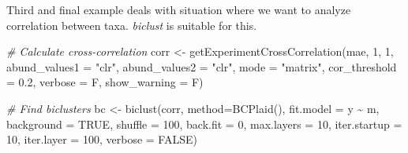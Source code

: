 \documentclass[
]{book}
\newenvironment{Shaded}{\begin{snugshade}}{\end{snugshade}}
\newcommand{\AttributeTok}[1]{\textcolor[rgb]{0.77,0.63,0.00}{#1}}
\newcommand{\CommentTok}[1]{\textcolor[rgb]{0.56,0.35,0.01}{\textit{#1}}}
\newcommand{\ConstantTok}[1]{\textcolor[rgb]{0.00,0.00,0.00}{#1}}
\newcommand{\DecValTok}[1]{\textcolor[rgb]{0.00,0.00,0.81}{#1}}
\newcommand{\FloatTok}[1]{\textcolor[rgb]{0.00,0.00,0.81}{#1}}
\newcommand{\FunctionTok}[1]{\textcolor[rgb]{0.00,0.00,0.00}{#1}}
\newcommand{\NormalTok}[1]{#1}
\newcommand{\OtherTok}[1]{\textcolor[rgb]{0.56,0.35,0.01}{#1}}
\newcommand{\SpecialCharTok}[1]{\textcolor[rgb]{0.00,0.00,0.00}{#1}}
\newcommand{\StringTok}[1]{\textcolor[rgb]{0.31,0.60,0.02}{#1}}
\begin{document}
Third and final example deals with situation where we want to analyze correlation
between taxa. \emph{biclust} is suitable for this.

\begin{Shaded}
\begin{Highlighting}[]
\CommentTok{\# Calculate cross{-}correlation}
\NormalTok{corr }\OtherTok{\textless{}{-}} \FunctionTok{getExperimentCrossCorrelation}\NormalTok{(mae, }\DecValTok{1}\NormalTok{, }\DecValTok{1}\NormalTok{, }
                                      \AttributeTok{abund\_values1 =} \StringTok{"clr"}\NormalTok{, }\AttributeTok{abund\_values2 =} \StringTok{"clr"}\NormalTok{, }
                                      \AttributeTok{mode =} \StringTok{"matrix"}\NormalTok{,}
                                      \AttributeTok{cor\_threshold =} \FloatTok{0.2}\NormalTok{, }\AttributeTok{verbose =}\NormalTok{ F, }\AttributeTok{show\_warning =}\NormalTok{ F)}

\CommentTok{\# Find biclusters}
\NormalTok{bc }\OtherTok{\textless{}{-}} \FunctionTok{biclust}\NormalTok{(corr, }\AttributeTok{method=}\FunctionTok{BCPlaid}\NormalTok{(), }\AttributeTok{fit.model =}\NormalTok{ y }\SpecialCharTok{\textasciitilde{}}\NormalTok{ m,}
              \AttributeTok{background =} \ConstantTok{TRUE}\NormalTok{, }\AttributeTok{shuffle =} \DecValTok{100}\NormalTok{, }\AttributeTok{back.fit =} \DecValTok{0}\NormalTok{, }\AttributeTok{max.layers =} \DecValTok{10}\NormalTok{,}
              \AttributeTok{iter.startup =} \DecValTok{10}\NormalTok{, }\AttributeTok{iter.layer =} \DecValTok{100}\NormalTok{, }\AttributeTok{verbose =} \ConstantTok{FALSE}\NormalTok{)}
\end{Highlighting}
\end{Shaded}

\begin{Shaded}
\end{Shaded}
\end{document}
